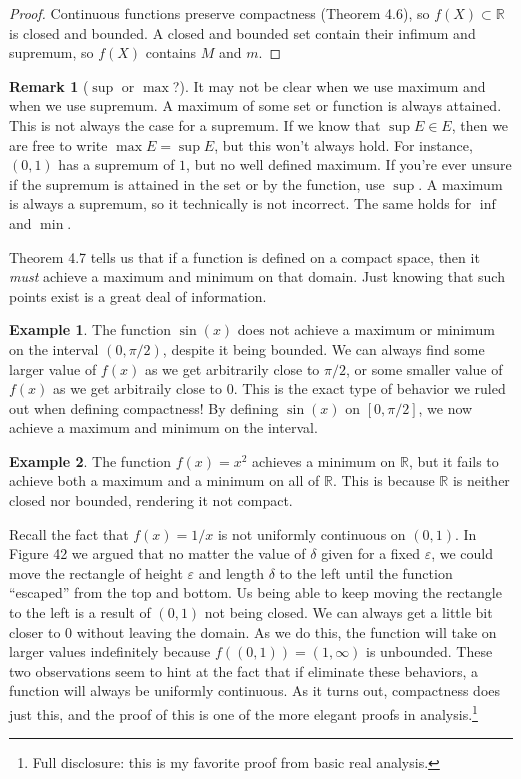 \documentclass{article}
\newcommand{\R}{\mathbb{R}}
\theoremstyle{definition}
\newtheorem{example}{Example}[section]
\newtheorem{remark}{Remark}[section]
\begin{document}
	\begin{proof}
		Continuous functions preserve compactness (Theorem 4.6), so $ f(X)\subset\R $ is closed and bounded. A closed and bounded set contain their infimum and supremum, so $ f(X) $ contains $ M $ and $ m $. 
	\end{proof}
	\begin{remark}[$ \sup $ or $ \max $?]
		It may not be clear when we use maximum and when we use supremum. A maximum of some set or function is always attained. This is not always the case for a supremum. If we know that $ \sup E\in E $, then we are free to write $ \max E=\sup E $, but this won't always hold. For instance, $ (0,1) $ has a supremum of $ 1 $, but no well defined maximum. If you're ever unsure if the supremum is attained in the set or by the function, use $ \sup $. A maximum is always a supremum, so it technically is not incorrect. The same holds for $ \inf $ and $ \min $.
	\end{remark}
	Theorem 4.7 tells us that if a function is defined on a compact space, then it \textit{must} achieve a maximum and minimum on that domain. Just knowing that such points exist is a great deal of information. 
	\begin{example}
		The function $ \sin(x) $ does not achieve a maximum or minimum on the interval $ (0,\pi/2) $, despite it being bounded. We can always find some larger value of $ f(x) $ as we get arbitrarily close to $ \pi/2 $, or some smaller value of $ f(x) $ as we get arbitraily close to $ 0 $. This is the exact type of behavior we ruled out when defining compactness! By defining $ \sin(x) $ on $ [0,\pi/2] $, we now achieve a maximum and minimum on the interval.  
	\end{example}
	\begin{example}
		The function $ f(x)=x^2 $ achieves a minimum on $ \R $, but it fails to achieve both a maximum and a minimum on all of $ \R $. This is because $ \R $ is neither closed nor bounded, rendering it not compact. 
	\end{example}
	Recall the fact that $ f(x)=1/x $ is not uniformly continuous on $ (0,1) $. In Figure 42 we argued that no matter the value of $ \delta $ given for a fixed $ \varepsilon $, we could move the rectangle of height $ \varepsilon $ and length $ \delta $ to the left until the function ``escaped'' from the top and bottom. Us being able to keep moving the rectangle to the left is a result of $ (0,1) $ not being closed. We can always get a little bit closer to $ 0 $ without leaving the domain. As we do this, the function will take on larger values indefinitely because $ f((0,1))=(1,\infty) $ is unbounded. These two observations seem to hint at the fact that if eliminate these behaviors, a function will always be uniformly continuous. As it turns out, compactness does just this, and the proof of this is one of the more elegant proofs in analysis.\footnote{Full disclosure: this is my favorite proof from basic real analysis.} 
\end{document}
